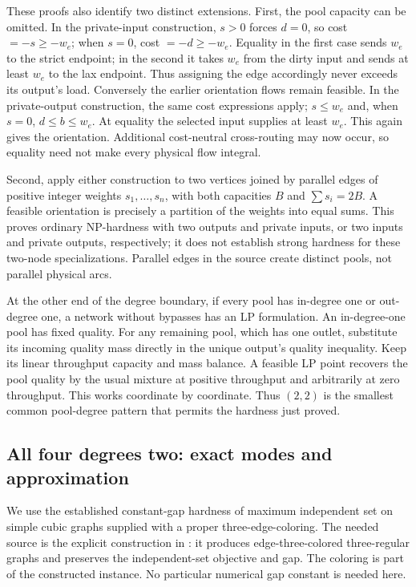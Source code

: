 These proofs also identify two distinct extensions. First, the pool
capacity can be omitted. In the private-input construction, $s>0$
forces $d=0$, so cost $=-s\ge-w_e$; when $s=0$, cost $=-d\ge-w_e$.
Equality in the first case sends $w_e$ to the strict endpoint; in the
second it takes $w_e$ from the dirty input and sends at least $w_e$ to
the lax endpoint. Thus assigning the edge accordingly never exceeds
its output's load. Conversely the earlier orientation flows remain
feasible. In the private-output construction, the same cost expressions
apply; $s\le w_e$ and, when $s=0$, $d\le b\le w_e$. At equality the
selected input supplies at least $w_e$. This again gives the orientation.
Additional cost-neutral cross-routing may now occur, so equality need
not make every physical flow integral.

Second, apply either construction to two vertices joined by parallel
edges of positive integer weights $s_1,\ldots,s_n$, with both capacities
$B$ and $\sum s_i=2B$. A feasible orientation is precisely a partition
of the weights into equal sums. This proves ordinary NP-hardness with
two outputs and private inputs, or two inputs and private outputs,
respectively; it does not establish strong hardness for these two-node
specializations. Parallel edges in the source create distinct pools,
not parallel physical arcs.

At the other end of the degree boundary, if every pool has in-degree
one or out-degree one, a network without bypasses has an LP formulation.
An in-degree-one pool has fixed quality. For any remaining pool, which
has one outlet, substitute its incoming quality mass directly in the
unique output's quality inequality. Keep its linear throughput capacity
and mass balance. A feasible LP point recovers the pool quality by the
usual mixture at positive throughput and arbitrarily at zero throughput.
This works coordinate by coordinate. Thus $(2,2)$ is the smallest common
pool-degree pattern that permits the hardness just proved.

\subsection{All four degrees two: exact modes and approximation}\label{s3:all-two}

We use the established constant-gap hardness of maximum independent set
on simple cubic graphs supplied with a proper three-edge-coloring.
The needed source is the explicit construction in
\citet[author manuscript, Section~5(A), pp.~25--26]{s3:chlebik2006}:
it produces edge-three-colored three-regular graphs and preserves the
independent-set objective and gap. The coloring is part of the constructed
instance. No particular numerical gap constant is needed here.

